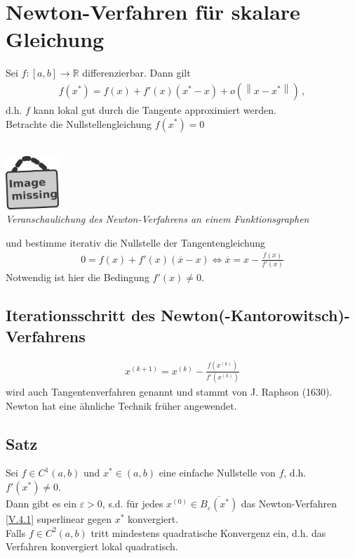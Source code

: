 \documentclass[ngerman,fontsize=11pt, paper=a4, parskip=half, titlepage=true, toc=bib]{scrbook}
\newcommand{\R}{\mathds{R}}
\newcommand{\nn}[1]{\left\| #1 \right\|}
\newcommand{\sectione}[1]{\section{#1} \setcounter{equation}{0}}
\newcommand{\imagemissing}[1]{
	\begin{center}~\\
		\centering 
		\includegraphics[width=2cm]{images/image_missing.jpg}\\
		\textit{#1} \\
	\end{center}
}
\begin{document}
	\sectione{Newton-Verfahren für skalare Gleichung} 
	Sei $f:[a,b]\longrightarrow \R$ differenzierbar. Dann gilt
	\begin{gather*}
		f(x^{*}) = f(x) + f'(x)(x^{*}-x)+o(\nn{x-x^{*}}) \, ,
	\end{gather*} 
	d.h. $f$ kann lokal gut durch die Tangente approximiert werden. \\
	Betrachte die Nullstellengleichung $f(x^{*}) = 0$ \\
	\imagemissing{Veranschaulichung des Newton-Verfahrens an einem Funktionsgraphen}
	und bestimme iterativ die Nullstelle der Tangentengleichung
	\begin{gather*}
		0=f(x) + f'(x)(\overline{x}-x) \Leftrightarrow \overline{x}= x-\frac{f(x)}{f'(x)}
	\end{gather*}
	Notwendig ist hier die Bedingung $f'(x) \neq 0$.
	
	
	\subsection{Iterationsschritt des Newton(-Kantorowitsch)-Verfahrens}
	\begin{gather}
		x^{(k+1)} = x^{(k)} - \frac{f(x^{(k)})}{f'(x^{(k)})}
		\label{V.4.1}
	\end{gather}
	wird auch Tangentenverfahren genannt und stammt von
	J. Raphson (1630). Newton hat eine ähnliche Technik früher angewendet.
	
	\subsection{Satz}\label{5.4.2}
	Sei $f\in C^1(a,b)$ und $x^{*}\in (a,b)$ eine einfache Nullstelle von $f$, d.h. $f'(x^{*})\neq 0$. \\
	Dann gibt es ein  $\varepsilon >0$, s.d. für jedes $x^{(0)}\in\overline{B_\varepsilon(x^{*})}$
	das Newton-Verfahren \eqref{V.4.1} superlinear gegen $x^{*}$ konvergiert.\\
	Falls $f\in C^2(a,b) $ tritt mindestens quadratische Konvergenz ein, d.h. das Verfahren
	konvergiert lokal quadratisch.
	
\end{document}
